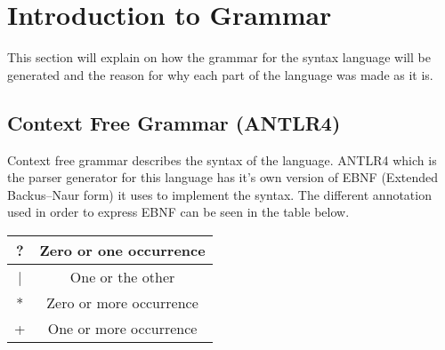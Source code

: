 \section{Introduction to Grammar}
This section will explain on how the grammar for the syntax language will be generated and the reason for why each part of the language was made as it is. 

\subsection{Context Free Grammar (ANTLR4)}
Context free grammar describes the syntax of the language. ANTLR4 which is the parser generator for this language has it's own version of EBNF (Extended Backus–Naur form) it uses to implement the syntax.
The different annotation used in order to express EBNF can be seen in the table below.
\begin{center}
\begin{tabular}{ |c|c| } 
 \hline
 ? & Zero or one occurrence\\ 
 \hline
 | & One or the other \\ 
 \hline
 * & Zero or more occurrence \\ 
 \hline
  + & One or more occurrence \\ 
 \hline
\end{tabular}
\end{center}


